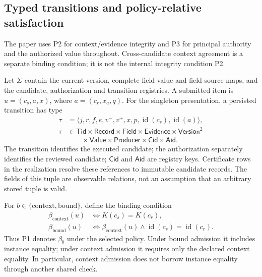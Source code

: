 \subsection{Typed transitions and policy-relative satisfaction}
\label{app:typed-contract}
The paper uses P2 for context/evidence integrity and P3 for principal authority
and the authorized value throughout. Cross-candidate context agreement is a
separate binding condition; it is not the internal integrity condition P2.

Let $\Sigma$ contain the current version, complete field-value and field-source
maps, and the candidate, authorization and transition registries. A submitted
item is $u=(c_s,a,x)$, where $a=(c_r,x_a,q)$. For the singleton presentation, a
persisted transition has type
\[
\begin{aligned}
 \tau&=\langle j,r,f,e,v^-,v^+,x,p,\operatorname{id}(c_s),\operatorname{id}(a)\rangle,\\
 \tau&\in \mathsf{Tid}\times\mathsf{Record}\times\mathsf{Field}\times\mathsf{Evidence}
 \times\mathsf{Version}^{2}\\
 &\qquad\times\mathsf{Value}\times\mathsf{Producer}
 \times\mathsf{Cid}\times\mathsf{Aid}.
\end{aligned}
\]
The transition identifies the executed candidate; the authorization separately
identifies the reviewed candidate; $\mathsf{Cid}$ and $\mathsf{Aid}$ are registry
keys. Certificate rows in the realization resolve
these references to immutable candidate records. The fields of this tuple are
observable relations, not an assumption that an arbitrary stored tuple is valid.

For $b\in\{\mathrm{context},\mathrm{bound}\}$, define the binding condition
\[
\begin{aligned}
 \beta_{\mathrm{context}}(u)&\iff K(c_s)=K(c_r),\\
 \beta_{\mathrm{bound}}(u)&\iff\beta_{\mathrm{context}}(u)
       \land\operatorname{id}(c_s)=\operatorname{id}(c_r).
\end{aligned}
\]
Thus P1 denotes $\beta_b$ under the selected policy. Under bound admission it
includes instance equality; under context admission it requires only the
declared context equality. In particular, context admission does not borrow
instance equality through another shared check.

